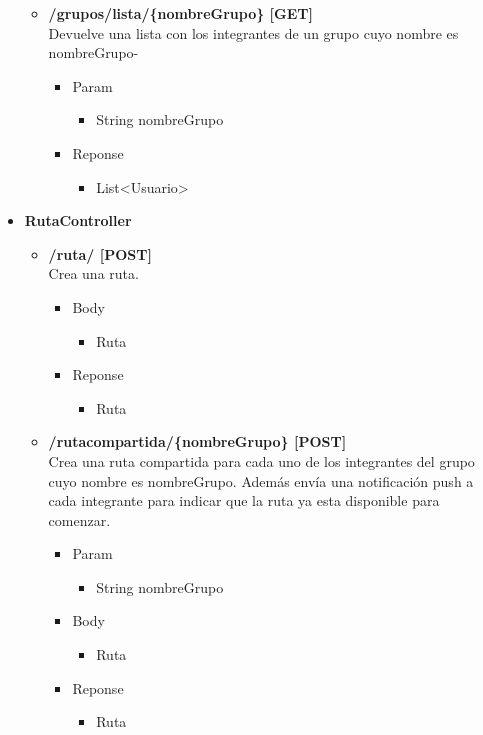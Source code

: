 \begin{itemize}
\begin{itemize}
\item  \textbf{/grupos/lista/\{nombreGrupo\} [GET]}\\
Devuelve una lista con los integrantes de un grupo cuyo nombre es nombreGrupo-
\begin{itemize}
\item Param
\begin{itemize}
\item String nombreGrupo
\end{itemize}
\item Reponse
\begin{itemize}
\item List<Usuario>
\end{itemize}
\end{itemize}
\end{itemize}
% 
\item \textbf{RutaController}

\begin{itemize}
\item  \textbf{/ruta/ [POST]}\\
Crea una ruta.
\begin{itemize}
\item Body
\begin{itemize}
\item Ruta
\end{itemize}
\item Reponse
\begin{itemize}
\item Ruta
\end{itemize}
\end{itemize}
\end{itemize}





\begin{itemize}
\item  \textbf{/rutacompartida/\{nombreGrupo\} [POST]}\\
Crea una ruta compartida para cada uno de los integrantes del grupo cuyo nombre es nombreGrupo.  Además envía una notificación push a cada integrante para indicar que la ruta ya esta disponible para comenzar.
\begin{itemize}
\item Param
\begin{itemize}
\item String nombreGrupo
\end{itemize}
\item Body
\begin{itemize}
\item Ruta 
\end{itemize}
\item Reponse
\begin{itemize}
\item Ruta
\end{itemize}
\end{itemize}
\end{itemize}



\end{itemize}
